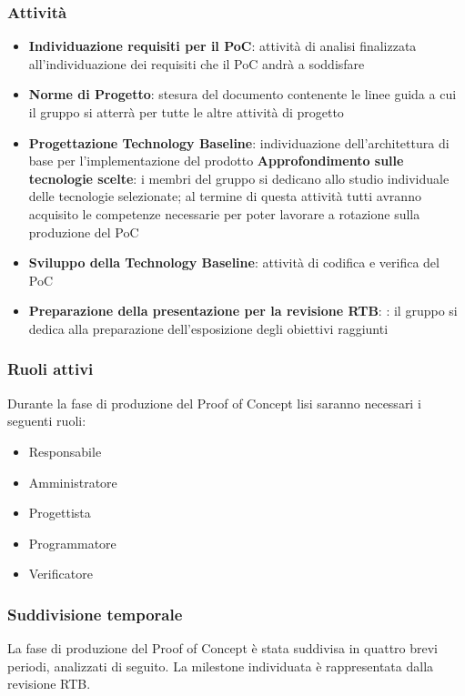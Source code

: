 \subsubsection{Attività}
\begin{itemize}
	\item \textbf{Individuazione requisiti per il PoC}: attività di analisi finalizzata all’individuazione dei requisiti che il PoC andrà a soddisfare
    \item \textbf{Norme di Progetto}: stesura del documento contenente le linee guida a cui il gruppo si atterrà per tutte le altre attività di progetto
    \item \textbf{Progettazione Technology Baseline}: individuazione dell’architettura di base per l’implementazione del prodotto
        \subitem \textbf{Approfondimento sulle tecnologie scelte}: i membri del gruppo si dedicano allo studio individuale delle tecnologie selezionate; al termine di questa attività tutti avranno acquisito le competenze necessarie per poter lavorare a rotazione sulla produzione del PoC
    \item \textbf{Sviluppo della Technology Baseline}: attività di codifica e verifica del PoC
    \item \textbf{Preparazione della presentazione per la revisione RTB}: : il gruppo si dedica alla preparazione dell’esposizione degli obiettivi raggiunti
\end{itemize}

\subsubsection{Ruoli attivi}
Durante la fase di produzione del Proof of Concept lisi saranno necessari i seguenti ruoli:
\begin{itemize}
	\item Responsabile
    \item Amministratore
    \item Progettista
    \item Programmatore
    \item Verificatore
\end{itemize}

\subsubsection{Suddivisione temporale}
La fase di produzione del Proof of Concept è stata suddivisa in quattro brevi periodi, analizzati di seguito. La milestone individuata è rappresentata dalla revisione RTB.

